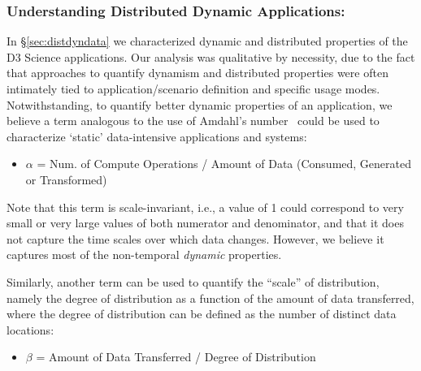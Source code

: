 
\subsubsection{Understanding Distributed Dynamic Applications: }
\label{sec:quantifyingdistapps}

In \S\ref{sec:distdyndata} we characterized dynamic and distributed
properties of the D3 Science applications. Our analysis was
qualitative by necessity, due to the fact that approaches to quantify
dynamism and distributed properties were often intimately tied to
application/scenario definition and specific usage modes.
Notwithstanding, to quantify better dynamic properties of an
application, we believe a term analogous to the use of Amdahl's
number~\cite{10.1109/ICDE.2000.839382} could be used to characterize `static'
data-intensive applications and systems:

\begin{itemize}
\item[] $\alpha$ = Num. of Compute Operations / Amount of Data
  (Consumed, Generated or Transformed)
\end{itemize}

Note that this term is scale-invariant, i.e., a value of 1 could
correspond to very small or very large values of both numerator and
denominator, and that it does not capture the time scales over
which data changes. However, we believe it captures most of the
non-temporal {\it dynamic} properties.



Similarly, another term can be used to quantify the
``scale'' of distribution, namely the degree of distribution as a
function of the amount of data transferred, where the degree of
distribution can be defined as the number of distinct data locations:

\begin{itemize}
\item[] $\beta$ = Amount of Data Transferred / Degree of
  Distribution
\end{itemize}

